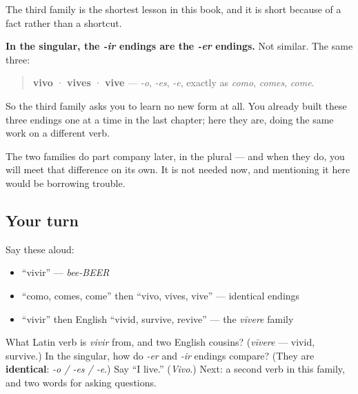 \begin{grammarlens}[title={Grammar Lens: the family that costs nothing}]
The third family is the shortest lesson in this book, and it is short because of a fact rather than a shortcut.

\textbf{In the singular, the \emph{-ir} endings are the \emph{-er} endings.} Not similar. The same three:

\begin{quote}
\textbf{vivo} · \textbf{vives} · \textbf{vive} — \emph{-o}, \emph{-es}, \emph{-e}, exactly as \emph{como}, \emph{comes}, \emph{come}.
\end{quote}

So the third family asks you to learn no new form at all. You already built these three endings one at a time in the last chapter; here they are, doing the same work on a different verb.

The two families do part company later, in the plural — and when they do, you will meet that difference on its own. It is not needed now, and mentioning it here would be borrowing trouble.
\end{grammarlens}

\subsection*{Your turn}
Say these aloud:

\begin{itemize}
\raggedright
  \item \textquotedblleft{}vivir\textquotedblright{} — \emph{bee-BEER}
  \item \textquotedblleft{}como, comes, come\textquotedblright{} then \textquotedblleft{}vivo, vives, vive\textquotedblright{} — identical endings
  \item \textquotedblleft{}vivir\textquotedblright{} then English \textquotedblleft{}vivid, survive, revive\textquotedblright{} — the \emph{vīvere} family
\end{itemize}

\begin{tcolorbox}[breakable,colback=teal!4,colframe=teal!35!black,title={Before you move on}]
What Latin verb is \emph{vivir} from, and two English cousins? (\emph{vīvere} — vivid, survive.) In the singular, how do \emph{-er} and \emph{-ir} endings compare? (They are \textbf{identical}: \emph{-o / -es / -e}.) Say \textquotedblleft{}I live.\textquotedblright{} (\emph{Vivo}.) Next: a second verb in this family, and two words for asking questions.
\end{tcolorbox}
